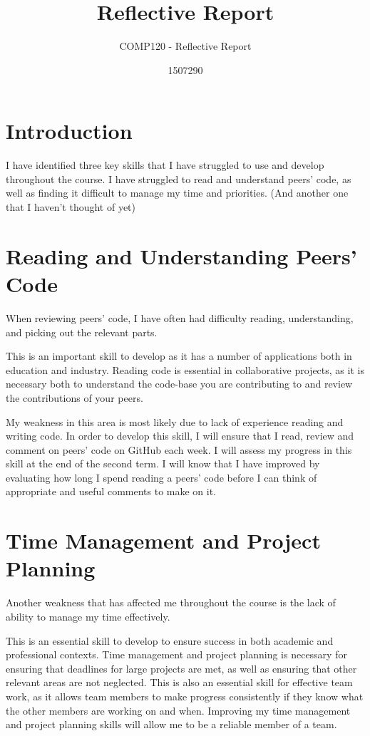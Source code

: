\documentclass{scrartcl}
\title{Reflective Report}
\subtitle{COMP120 - Reflective Report}
\author{1507290}
\begin{document}
\maketitle

\abstract{}

\section{Introduction}
I have identified three key skills that I have struggled to use and develop throughout the course. I have struggled to read and understand peers' code, as well as finding it difficult to manage my time and priorities. (And another one that I haven't thought of yet)

\section{Reading and Understanding Peers' Code}
When reviewing peers' code, I have often had difficulty reading, understanding, and picking out the relevant parts.

This is an important skill to develop as it has a number of applications both in education and industry. Reading code is essential in collaborative projects, as it is necessary both to understand the code-base you are contributing to and review the contributions of your peers.

My weakness in this area is most likely due to lack of experience reading and writing code. In order to develop this skill, I will ensure that I read, review and comment on peers' code on GitHub each week. I will assess my progress in this skill at the end of the second term. I will know that I have improved by evaluating how long I spend reading a peers' code before I can think of appropriate and useful comments to make on it. 

\section{Time Management and Project Planning}
Another weakness that has affected me throughout the course is the lack of ability to manage my time effectively.

This is an essential skill to develop to ensure success in both academic and professional contexts. Time management and project planning is necessary for ensuring that deadlines for large projects are met, as well as ensuring that other relevant areas are not neglected. This is also an essential skill for effective team work, as it allows team members to make progress consistently if they know what the other members are working on and when. Improving my time management and project planning skills will allow me to be a reliable member of a team.
\end{document}
